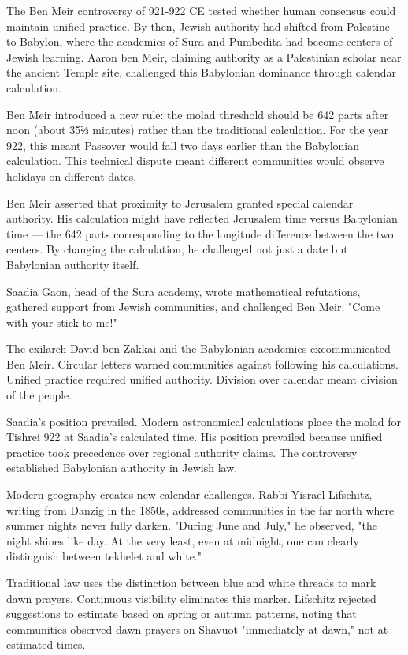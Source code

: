The Ben Meir controversy of 921-922 CE tested whether human consensus could maintain unified practice. By then, Jewish authority had shifted from Palestine to Babylon, where the academies of Sura and Pumbedita had become centers of Jewish learning. Aaron ben Meir, claiming authority as a Palestinian scholar near the ancient Temple site, challenged this Babylonian dominance through calendar calculation.

Ben Meir introduced a new rule: the molad threshold should be 642 parts after noon (about 35⅔ minutes) rather than the traditional calculation. For the year 922, this meant Passover would fall two days earlier than the Babylonian calculation. This technical dispute meant different communities would observe holidays on different dates.

 Ben Meir asserted that proximity to Jerusalem granted special calendar authority. His calculation might have reflected Jerusalem time versus Babylonian time — the 642 parts corresponding to the longitude difference between the two centers. By changing the calculation, he challenged not just a date but Babylonian authority itself.

Saadia Gaon, head of the Sura academy, wrote mathematical refutations, gathered support from Jewish communities, and challenged Ben Meir: "Come with your stick to me!"

The exilarch David ben Zakkai and the Babylonian academies excommunicated Ben Meir. Circular letters warned communities against following his calculations. Unified practice required unified authority. Division over calendar meant division of the people.

Saadia's position prevailed. Modern astronomical calculations place the molad for Tishrei 922 at Saadia's calculated time. His position prevailed because unified practice took precedence over regional authority claims. The controversy established Babylonian authority in Jewish law.

Modern geography creates new calendar challenges. Rabbi Yisrael Lifschitz, writing from Danzig in the 1850s, addressed communities in the far north where summer nights never fully darken. "During June and July," he observed, "the night shines like day. At the very least, even at midnight, one can clearly distinguish between tekhelet and white."

Traditional law uses the distinction between blue and white threads to mark dawn prayers. Continuous visibility eliminates this marker. Lifschitz rejected suggestions to estimate based on spring or autumn patterns, noting that communities observed dawn prayers on Shavuot "immediately at dawn," not at estimated times.


